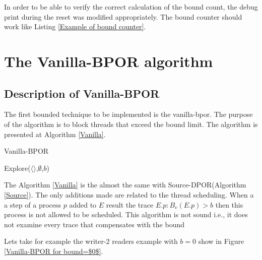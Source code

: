 In order to be able to verify the correct calculation of the bound count, the debug print during the reset was modified appropriately.
The bound counter should work like Listing \ref{Example of bound counter}.


\section{The Vanilla-BPOR algorithm}


\subsection{Description of Vanilla-BPOR}
The first bounded technique to be implemented is the vanilla-bpor. The purpose of the algorithm is to block threads that exceed the bound
limit. The algorithm is presented at Algorithm \ref{Vanilla}.

\begin{algorithm}
    \caption{Vanilla-BPOR}
    \label{Vanilla}
    Explore($\langle \rangle$,$\emptyset$,$b$)\;
\end{algorithm}

The Algorithm \ref{Vanilla} is the almost the same with Source-DPOR(Algorithm \ref{Source}). The only additions made are related to the 
thread scheduling. When a a step of a process $p$ added to $E$ result the trace $E.p : B_v(E.p) > b$ then this process is not allowed to be scheduled.
This algorithm is not sound i.e., it does not examine every trace that compensates with the bound

Lets take for example the writer-2 readers example with $b=0$ show in Figure \ref{Vanilla-BPOR for bound=$0$}. 


